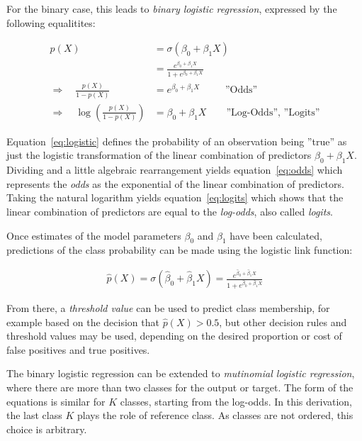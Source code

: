 For the binary case, this leads to \emph{binary logistic regression}, expressed by the following equalitites:

\begin{align}
p(X) &= \sigma( \beta_0 + \beta_1 X) \nonumber \\ 
     &= \frac{e^{\beta_0 + \beta_1 X}}{1 + e^{\beta_0 + \beta_1 X}} \label{eq:logistic} \\
\Rightarrow \quad \frac{p(X)}{1 - p(X)} &= e^{\beta_0 + \beta_1 X} \qquad\;\; \text{''Odds''} \label{eq:odds} \\
\Rightarrow \quad \log \left( \frac{p(X)}{1 - p(X)} \right) &= \beta_0 + \beta_1 X \qquad \text{''Log-Odds'', ''Logits''} \label{eq:logits}
\end{align}

Equation~\ref{eq:logistic} defines the probability of an observation being ''true'' as just the logistic transformation of the linear combination of predictors $\beta_0 + \beta_1 X$. Dividing and a little algebraic rearrangement yields equation~\ref{eq:odds} which represents the \emph{odds} as the exponential of the linear combination of predictors. Taking the natural logarithm yields equation~\ref{eq:logits} which shows that the linear combination of predictors are equal to the \emph{log-odds}, also called \emph{logits}.

Once estimates of the model parameters $\beta_0$ and $\beta_1$ have been calculated, predictions of the class probability can be made using the logistic link function:

\begin{align*}
  \hat{p}(X) = \sigma(\hat{\beta}_0 + \hat{\beta}_1 X) = \frac{e^{\hat{\beta}_0 + \hat{\beta}_1 X}}{1 + e^{\hat{\beta}_0 + \hat{\beta}_1 X}}
\end{align*}

From there, a \emph{threshold value} can be used to predict class membership, for example based on the decision that $\hat{p}(X) > 0.5$, but other decision rules and threshold values may be used, depending on the desired proportion or cost of false positives and true positives.

The binary logistic regression can be extended to \emph{mutinomial logistic regression}, where there are more than two classes for the output or target. The form of the equations is similar for $K$ classes, starting from the log-odds. In this derivation, the last class $K$ plays the role of reference class. As classes are not ordered, this choice is arbitrary.

